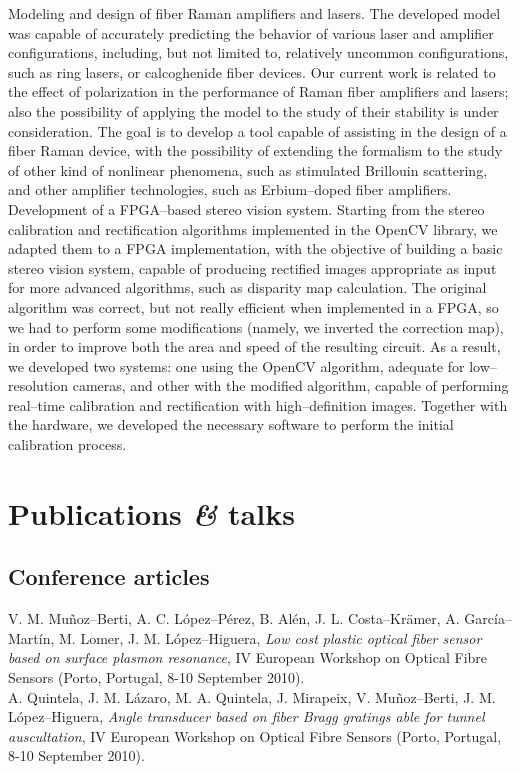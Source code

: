 \documentclass[11pt, a4paper]{article}
\newcommand{\amper}
           {{\fontspec[Scale=.95]
                      {Adobe Caslon Pro}\selectfont\itshape\&}}
\newcommand{\years}[1]{\marginnote{\scriptsize #1}}
\begin{document}
\years{2010--present}Modeling and design of fiber Raman amplifiers and lasers. The developed model was capable of accurately predicting the behavior of various laser and amplifier configurations, including, but not limited to, relatively uncommon configurations, such as ring lasers, or calcoghenide fiber devices. Our current work is related to the effect of polarization in the performance of Raman fiber amplifiers and lasers; also the possibility of applying the model to the study of their stability is under consideration. The goal is to develop a tool capable of assisting in the design of a fiber Raman device, with the possibility of extending the formalism to the study of other kind of nonlinear phenomena, such as stimulated Brillouin scattering, and other amplifier technologies, such as Erbium--doped fiber amplifiers.\\
\years{2011--present} Development of a FPGA--based stereo vision system. Starting from the stereo calibration and rectification algorithms implemented in the OpenCV library, we adapted them to a FPGA implementation, with the objective of building a basic stereo vision system, capable of producing rectified images appropriate as input for more advanced algorithms, such as disparity map calculation. The original algorithm was correct, but not really efficient when implemented in a FPGA, so we had to perform some modifications (namely, we inverted the correction map), in order to improve both the area and speed of the resulting circuit. As a result, we developed two systems: one using the OpenCV algorithm, adequate for low--resolution cameras, and other with the modified algorithm, capable of performing real--time calibration and rectification with high--definition images. Together with the hardware, we developed the necessary software to perform the initial calibration process.\\


\section*{Publications \amper{} talks} %

\subsection*{Conference articles}
\noindent
\years{2010}V. M. Muñoz--Berti, A. C. López--Pérez, B. Alén, J. L. Costa--Krämer, A. García--Martín, M. Lomer, J. M. López--Higuera, \textit{Low cost plastic optical fiber sensor based on surface plasmon resonance}, IV European Workshop on Optical Fibre Sensors (Porto, Portugal, 8-10 September 2010).\\
\years{2010}A. Quintela, J. M. Lázaro, M. A. Quintela, J. Mirapeix, V. Muñoz--Berti, J. M. López--Hi\-gue\-ra, \textit{Angle transducer based on fiber Bragg gratings able for tunnel auscultation}, IV European Workshop on Optical Fibre Sensors (Porto, Portugal, 8-10 September 2010).
\end{document}
